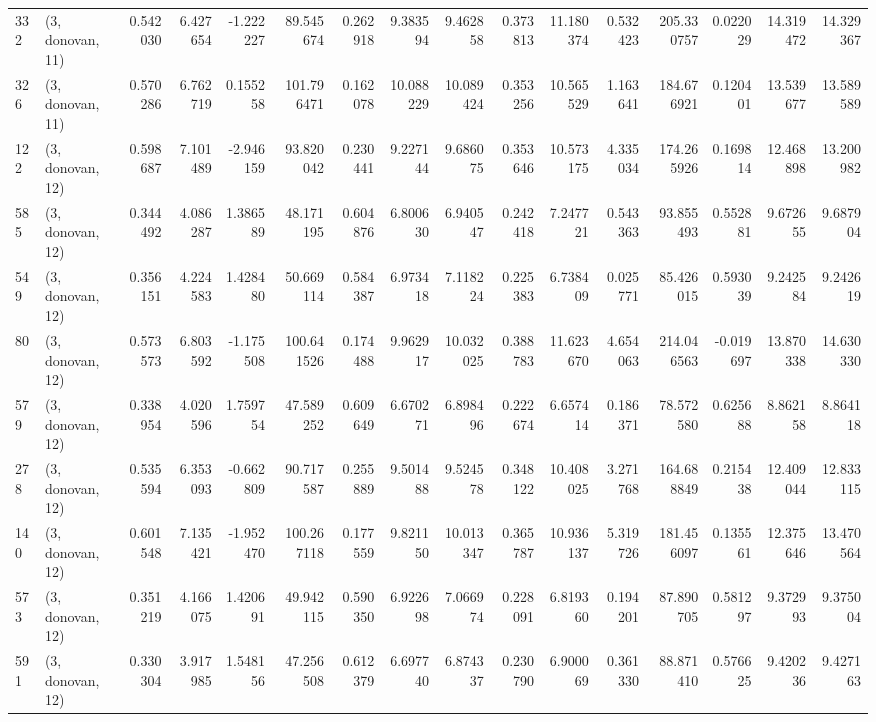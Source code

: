 \begin{tabular}{llrrrrrrrrrrrrrr}
332 &  (3, donovan, 11) &   0.542030 &   6.427654 &  -1.222227 &    89.545674 &   0.262918 &   9.383594 &   9.462858 &  0.373813 &  11.180374 &   0.532423 &   205.330757 &  0.022029 &  14.319472 &  14.329367 \\
326 &  (3, donovan, 11) &   0.570286 &   6.762719 &   0.155258 &   101.796471 &   0.162078 &  10.088229 &  10.089424 &  0.353256 &  10.565529 &   1.163641 &   184.676921 &  0.120401 &  13.539677 &  13.589589 \\
122 &  (3, donovan, 12) &   0.598687 &   7.101489 &  -2.946159 &    93.820042 &   0.230441 &   9.227144 &   9.686075 &  0.353646 &  10.573175 &   4.335034 &   174.265926 &  0.169814 &  12.468898 &  13.200982 \\
585 &  (3, donovan, 12) &   0.344492 &   4.086287 &   1.386589 &    48.171195 &   0.604876 &   6.800630 &   6.940547 &  0.242418 &   7.247721 &   0.543363 &    93.855493 &  0.552881 &   9.672655 &   9.687904 \\
549 &  (3, donovan, 12) &   0.356151 &   4.224583 &   1.428480 &    50.669114 &   0.584387 &   6.973418 &   7.118224 &  0.225383 &   6.738409 &   0.025771 &    85.426015 &  0.593039 &   9.242584 &   9.242619 \\
80  &  (3, donovan, 12) &   0.573573 &   6.803592 &  -1.175508 &   100.641526 &   0.174488 &   9.962917 &  10.032025 &  0.388783 &  11.623670 &   4.654063 &   214.046563 & -0.019697 &  13.870338 &  14.630330 \\
579 &  (3, donovan, 12) &   0.338954 &   4.020596 &   1.759754 &    47.589252 &   0.609649 &   6.670271 &   6.898496 &  0.222674 &   6.657414 &   0.186371 &    78.572580 &  0.625688 &   8.862158 &   8.864118 \\
278 &  (3, donovan, 12) &   0.535594 &   6.353093 &  -0.662809 &    90.717587 &   0.255889 &   9.501488 &   9.524578 &  0.348122 &  10.408025 &   3.271768 &   164.688849 &  0.215438 &  12.409044 &  12.833115 \\
140 &  (3, donovan, 12) &   0.601548 &   7.135421 &  -1.952470 &   100.267118 &   0.177559 &   9.821150 &  10.013347 &  0.365787 &  10.936137 &   5.319726 &   181.456097 &  0.135561 &  12.375646 &  13.470564 \\
573 &  (3, donovan, 12) &   0.351219 &   4.166075 &   1.420691 &    49.942115 &   0.590350 &   6.922698 &   7.066974 &  0.228091 &   6.819360 &   0.194201 &    87.890705 &  0.581297 &   9.372993 &   9.375004 \\
591 &  (3, donovan, 12) &   0.330304 &   3.917985 &   1.548156 &    47.256508 &   0.612379 &   6.697740 &   6.874337 &  0.230790 &   6.900069 &   0.361330 &    88.871410 &  0.576625 &   9.420236 &   9.427163 \\

\end{tabular}
